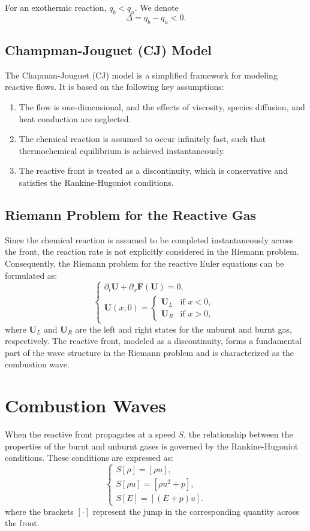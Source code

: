 For an exothermic reaction, $q_b < q_u$. We denote 
\[
\Delta = q_b - q_u <0.
\]

\subsection{Champman-Jouguet (CJ) Model}
The Chapman-Jouguet (CJ) model is a simplified framework for modeling reactive flows. It is based on the following key assumptions:
\begin{enumerate}
  \item The flow is one-dimensional, and the effects of viscosity, species diffusion, and heat conduction are neglected.
  \item The chemical reaction is assumed to occur infinitely fast, such that thermochemical equilibrium is achieved instantaneously.
  \item The reactive front is treated as a discontinuity, which is conservative and satisfies the Rankine-Hugoniot conditions.
\end{enumerate} 

\subsection{Riemann Problem for the Reactive Gas}
Since the chemical reaction is assumed to be completed instantaneously across the front, the reaction rate is not explicitly considered in the Riemann problem. Consequently, the Riemann problem for the reactive Euler equations can be formulated as:
\begin{equation}
\begin{cases}
\partial_t \mathbf{U} + \partial_x \mathbf{F}(\mathbf{U}) = 0, \\
\mathbf{U}(x,0) = \begin{cases} \mathbf{U}_L & \text{if } x < 0, \\ \mathbf{U}_R & \text{if } x > 0, \end{cases}
\end{cases}
\label{eq:riemann}
\end{equation}
where $\mathbf{U}_L$ and $\mathbf{U}_R$ are the left and right states for the unburnt and burnt gas, respectively.
The reactive front, modeled as a discontinuity, forms a fundamental part of the wave structure in the Riemann problem and is characterized as the combustion wave.
\section{Combustion Waves}
When the reactive front propagates at a speed $S$,
the relationship between the properties of the burnt and unburnt gases is governed by the Rankine-Hugoniot conditions. These conditions are expressed as:
\begin{equation}
\begin{cases}
S[\rho] = [\rho u], \\
S[\rho u] = [\rho u^2 + p], \\
S[E] = [(E+p)u].
\end{cases}
\label{eq:rankine-hugoniot}
\end{equation}
where the brackets $[\cdot]$ represent the jump in the corresponding quantity across the front.

